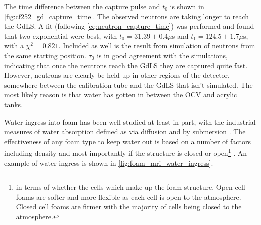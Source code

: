 



\par
The time difference between the capture pulse and $t_0$ is shown in \autoref{fig:cf252_gd_capture_time}.
The observed neutrons are taking longer to reach the GdLS.
A fit (following \autoref{eq:neutron_capture_time}) was performed and found that two exponential were best, with $t_0 = 31.39 \pm 0.4\mu$s and $t_1 = 124.5 \pm 1.7\mu$s, with a $\chi^2=0.821$.
Included as well is the result from simulation of neutrons from the same starting position.
$\tau_0$ is in good agreement with the simulations, indicating that once the neutrons reach the GdLS they are captured quite fast.
However, neutrons are clearly be held up in other regions of the detector, somewhere between the calibration tube and the GdLS that isn't simulated.
The most likely reason is that water has gotten in between the OCV and acrylic tanks.



\par
Water ingress into foam has been well studied at least in part, with the industrial measures of water absorption defined as via diffusion and by submersion \cite{foam_with_water_ref}.
The effectiveness of any foam type to keep water out is based on a number of factors including density and most importantly if the structure is closed or open\footnote{in terms of whether the cells which make up the foam structure. Open cell foams are softer and more flexible as each cell is open to the atmosphere. Closed cell foams are firmer with the majority of cells being closed to the atmosphere.} \cite{mechanical_properties_of_foam_ref}.
An example of water ingress is shown in \autoref{fig:foam_mri_water_ingress}.


